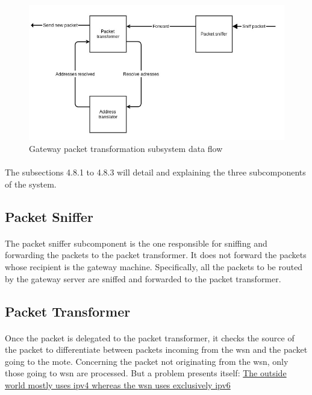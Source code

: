 \documentclass[oneside,12pt,a4paper,final]{book}
\begin{document}
\begin{figure}[htbp]
\centering
\includegraphics[scale=0.6]{img/packet_transformation.jpg}
\caption{Gateway packet transformation subsystem data flow}
\label{fig:gateway_transformation}
\end{figure}
\paragraph{}
The subsections 4.8.1 to 4.8.3 will detail and explaining the three subcomponents of the system.

\subsection{Packet Sniffer}
\paragraph{}
The packet sniffer subcomponent is the one responsible for sniffing and forwarding the packets to the packet transformer. It does not forward the packets whose recipient is the gateway machine. Specifically, all the packets to be routed by the gateway server are sniffed and forwarded to the packet transformer.
\subsection{Packet Transformer}
\paragraph{}
Once the packet is delegated to the packet transformer, it checks the source of the packet to differentiate between packets incoming from the \gls{wsn} and the packet going to the mote. Concerning the packet not originating from the \gls{wsn}, only those going to \gls{wsn} are processed. But a problem presents itself: 
\underline{The outside world mostly uses \gls{ipv4} whereas the \gls{wsn} uses exclusively \gls{ipv6}}
\end{document}
